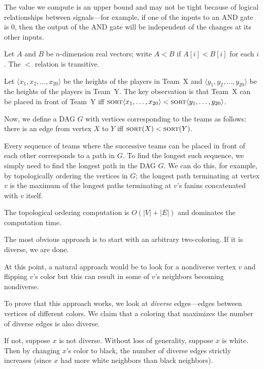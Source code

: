 The value we compute is an upper bound and may not be tight because of
logical relationships between signals---for example, if one of the inputs to an
AND gate is 0, then the output of the AND gate will be independent of the changes at its other inputs.

Let $A$ and $B$ be $n$-dimension real vectors;
write $A < B$ if $A[i] < B[i]$ for each $i$. 
The $<$ relation is transitive.

Let $\langle x_1,x_2,\ldots,x_{20}\rangle$ be the heights of
the players in Team~X and $\langle y_1,y_2,\ldots,y_{20}\rangle$
be the heights of the players in Team~Y.
The key observation
is that Team~X can be placed in front of Team~Y
iff $\mbox{\textsc{sort}}\langle x_1,\ldots,x_{20}\rangle < \mbox{\textsc{sort}}\langle y_1,\ldots,y_{20}\rangle$.

Now, we define a DAG $G$ with vertices corresponding
to the teams as follows: there is an edge from vertex $X$ to $Y$ iff
$\mbox{\textsc{sort}}(X) < \mbox{\textsc{sort}}(Y)$.

Every sequence of teams where the successive teams can 
be placed in front of each other corresponds to a path in $G$. 
To find the longest such sequence, we simply need to find the longest
path in the DAG $G$. We can do this, for example, by topologically
ordering the vertices in $G$; the longest path terminating at vertex 
$v$ is the maximum of the longest paths terminating at $v$'s fanins
concatenated with $v$ itself.  

The topological ordering computation is $O(|V| + |E|)$
and dominates the computation time.


The most obvious approach is to start with an arbitrary two-coloring.  
If it is diverse, we are done.  

At this point, a natural approach  would be to look  for a nondiverse vertex $v$
and flipping $v$'s color but this can result in some of $v$'s 
neighbors becoming nondiverse.

To prove that this approach works, we look at {\em diverse} edges---edges between 
vertices of different colors.
We claim that a coloring that maximizes the number of diverse edges is also
diverse.

If not, suppose $x$ is not diverse.  Without loss of 
generality, suppose $x$ is white. Then by changing $x$'s color to black,
the number of diverse edges strictly
increases (since $x$ had more white  neighbors than black neighbors).

